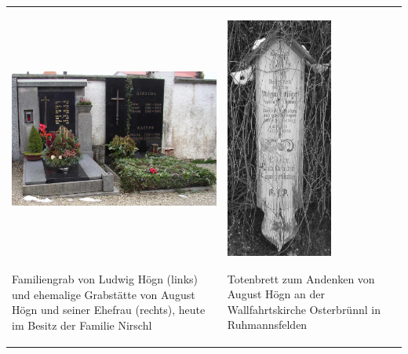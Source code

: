 \begin{flushleft}
\tablefirsthead{}
\tablehead{}
\tabletail{}
\tablelasttail{}
\begin{supertabular}{m{12.311cm}m{3.6929998cm}}

\includegraphics[width=12.129cm,height=8.015cm]{pictures/zulassungsarbeit-img057.jpg}

Familiengrab von Ludwig Högn (links)
und ehemalige Grabstätte von August Högn und seiner Ehefrau (rechts),
heute im Besitz der Familie Nirschl &

\includegraphics[width=3.51cm,height=7.978cm]{pictures/zulassungsarbeit-img058.jpg}

Totenbrett zum Andenken von August Högn
an der Wallfahrtskirche Osterbrünnl in Ruhmannsfelden\\
\end{supertabular}
\end{flushleft}
